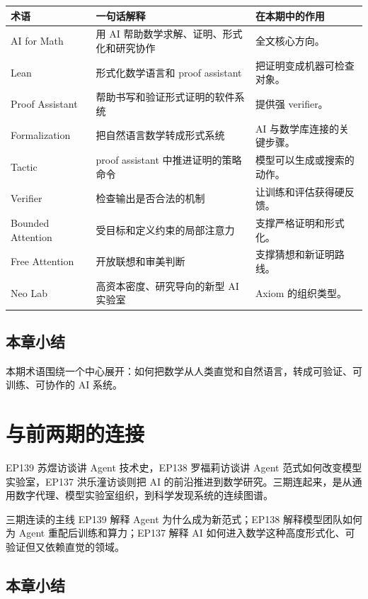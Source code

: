 \documentclass[a4paper]{article}
\begin{document}
\begin{longtable}{p{}p{}p{}}
\toprule
术语 & 一句话解释 & 在本期中的作用 \\
\midrule
AI for Math & 用 AI 帮助数学求解、证明、形式化和研究协作 & 全文核心方向。 \\
Lean & 形式化数学语言和 proof assistant & 把证明变成机器可检查对象。 \\
Proof Assistant & 帮助书写和验证形式证明的软件系统 & 提供强 verifier。 \\
Formalization & 把自然语言数学转成形式系统 & AI 与数学库连接的关键步骤。 \\
Tactic & proof assistant 中推进证明的策略命令 & 模型可以生成或搜索的动作。 \\
Verifier & 检查输出是否合法的机制 & 让训练和评估获得硬反馈。 \\
Bounded Attention & 受目标和定义约束的局部注意力 & 支撑严格证明和形式化。 \\
Free Attention & 开放联想和审美判断 & 支撑猜想和新证明路线。 \\
Neo Lab & 高资本密度、研究导向的新型 AI 实验室 & Axiom 的组织类型。 \\
\bottomrule
\end{longtable}

\subsection{本章小结}

本期术语围绕一个中心展开：如何把数学从人类直觉和自然语言，转成可验证、可训练、可协作的 AI 系统。

\section{与前两期的连接}

EP139 苏煜访谈讲 Agent 技术史，EP138 罗福莉访谈讲 Agent 范式如何改变模型实验室，EP137 洪乐潼访谈则把 AI 的前沿推进到数学研究。三期连起来，是从通用数字代理、模型实验室组织，到科学发现系统的连续图谱。

\begin{importantbox}{三期连读的主线}
EP139 解释 Agent 为什么成为新范式；EP138 解释模型团队如何为 Agent 重配后训练和算力；EP137 解释 AI 如何进入数学这种高度形式化、可验证但又依赖直觉的领域。
\end{importantbox}

\subsection{本章小结}
\end{document}
